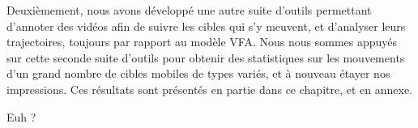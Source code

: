	Deuxièmement, nous avons développé une autre suite d'outils permettant d'annoter des vidéos afin de suivre les cibles qui s'y meuvent, et d'analyser leurs trajectoires, toujours par rapport au modèle VFA. Nous nous sommes appuyés sur cette seconde suite d'outils pour obtenir des statistiques sur les mouvements d'un grand nombre de cibles mobiles de types variés, et à nouveau étayer nos impressions. Ces résultats sont présentés en partie dans ce chapitre, et en annexe.
	
	Euh ?

\clearpage
